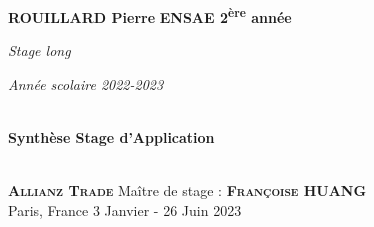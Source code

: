 \begin{titlepage}
\begin{center}

\begin{minipage}{1\textwidth}
\Large{\textbf{ROUILLARD Pierre}} 
\hfill
\large{\textbf{ENSAE 2\textsuperscript{ère} année}}\par
\vspace{0cm}
\hfill \normalsize{\textit{Stage long}}\par
\hfill \normalsize{\textit{Année scolaire 2022-2023}}  
\end{minipage}

\vspace{8cm}

\begin{center}

\HRule \\[1cm]
{\huge \bfseries{Synthèse Stage d'Application}}\\[0.5cm]
\HRule \\[2.5cm]

\end{center}

\vfill

\begin{minipage}{1\textwidth}
\begin{flushleft}
\large{\textbf{\textsc{Allianz Trade}}} \hfill \small{Maître de stage :} \large{\textbf{\textsc{Françoise HUANG}}} \\ 
\small{Paris, France} \hfill \small{3 Janvier - 26 Juin 2023}
\end{flushleft}
\end{minipage}

\end{center}
\end{titlepage}